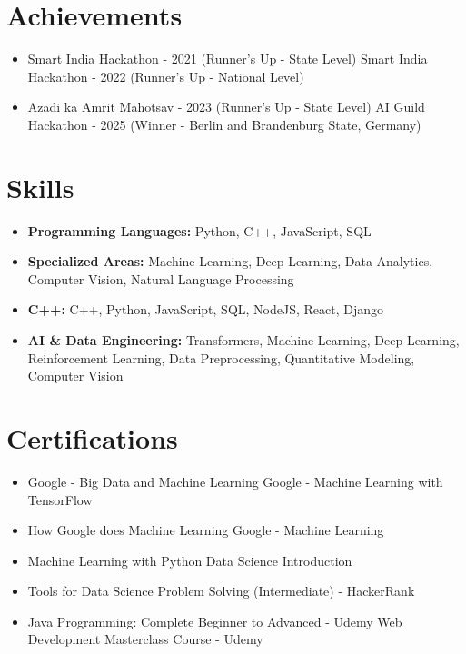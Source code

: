 \documentclass[a4paper,10pt]{article}
\begin{document}
\section*{Achievements}
\begin{itemize}
\item Smart India Hackathon - 2021 (Runner's Up - State Level) \hfill Smart India Hackathon - 2022 (Runner's Up - National Level)
\item Azadi ka Amrit Mahotsav - 2023 (Runner's Up - State Level) \hfill AI Guild Hackathon - 2025 (Winner - Berlin and Brandenburg State, Germany)
\end{itemize}

\section*{Skills}
\begin{itemize}
  \item \textbf{Programming Languages:} Python, C++, JavaScript, SQL
  \item \textbf{Specialized Areas:} Machine Learning, Deep Learning, Data Analytics, Computer Vision, Natural Language Processing
  \item \textbf{C++:} C++, Python, JavaScript, SQL, NodeJS, React, Django
  \item \textbf{AI \& Data Engineering:} Transformers, Machine Learning, Deep Learning, Reinforcement Learning, Data Preprocessing, Quantitative Modeling, Computer Vision
\end{itemize}

\section*{Certifications}
\begin{itemize}
\item Google - Big Data and Machine Learning \hfill Google - Machine Learning with TensorFlow
\item How Google does Machine Learning \hfill Google - Machine Learning
\item Machine Learning with Python \hfill Data Science Introduction
\item Tools for Data Science \hfill Problem Solving (Intermediate) - HackerRank
\item Java Programming: Complete Beginner to Advanced - Udemy \hfill Web Development Masterclass Course - Udemy
\end{itemize}
\end{document}
